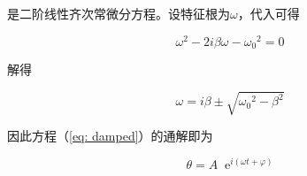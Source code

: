 \documentclass[a4paper,11pt]{article}
\newcommand*{\e}{\mathop{}\!\mathrm{e}}
\begin{document}
        是二阶线性齐次常微分方程。设特征根为$\omega$，代入可得

        \begin{equation}
            \omega^2 - 2i\beta \omega - {\omega_0}^2 = 0
        \end{equation}

        解得

        \begin{equation}
            \omega = i\beta \pm \sqrt{{\omega_0}^2 - \beta^2}
        \end{equation}
        
        因此方程（\ref{eq: damped}）的通解即为

        \begin{equation}
            \theta = A\e^{i(\omega t + \varphi)}
        \end{equation}
\end{document}
